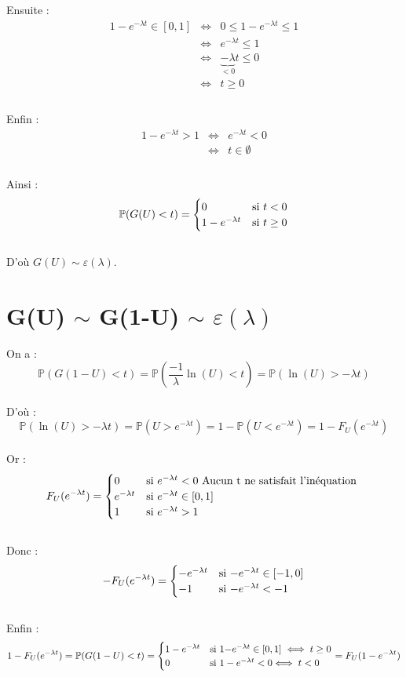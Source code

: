 \documentclass[12,french]{report}
\begin{document}
Ensuite :
$$\begin{array}{ccl}
	1-e^{-\lambda t}\in[0,1] & \iff & 0\leq1-e^{-\lambda t}\leq1 \\
					   & \iff & e^{-\lambda t}\leq1 \\
					   & \iff & \underbrace{-\lambda}_{<0}t\leq0 \\
					   & \iff & t\geq0 \\
\end{array}$$\\

Enfin :
$$\begin{array}{ccl}
	1-e^{-\lambda t}>1 & \iff & e^{-\lambda t}<0 \\
	& \iff & t\in\emptyset \\
  \end{array}$$\\
  
Ainsi :
$$\mathbb{P}(G(U)<t)=\begin{cases}
0 & \text{si \ensuremath{t<0}}\\
1-e^{-\lambda t} & \text{si }t\geq0
\end{cases}$$\\

D'où $G(U) \sim \varepsilon(\lambda)$.\vspace{0.4cm}
 
\section{G(U) $\sim$ G(1-U) $\sim$ $\varepsilon(\lambda)$}

On a :
$$\mathbb{P}(G(1-U)<t)=\mathbb{P}(\frac{-1}{\lambda}\ln(U)<t)=\mathbb{P}(\ln(U)>-\lambda t)$$\\
D'où : $$\mathbb{P}(\ln(U)>-\lambda t)=\mathbb{P}(U>e^{-\lambda t})=1-\mathbb{P}(U<e^{-\lambda t})=1-F_{U}(e^{-\lambda t})$$\\

Or : $$F_{U}(e^{-\lambda t})=\begin{cases}
0 & \text{si \ensuremath{e^{-\lambda t}<0}}\text{ Aucun t ne satisfait l'inéquation }\\
e^{-\lambda t} & \text{si \ensuremath{e^{-\lambda t}}}\in[0,1]\\
1 & \text{si \ensuremath{e^{-\lambda t}>1}}
\end{cases}$$\\
Donc :
$$-F_{U}(e^{-\lambda t})=\begin{cases}
-e^{-\lambda t} & \text{si \ensuremath{-}\ensuremath{e^{-\lambda t}}}\in[-1,0]\\
-1 & \text{si \ensuremath{-e^{-\lambda t}<-1}}
\end{cases}$$\\
Enfin :
$$1-F_{U}(e^{-\lambda t})=\mathbb{P}(G(1-U)<t)=\begin{cases}
1-e^{-\lambda t} & \text{si \ensuremath{1-}\ensuremath{e^{-\lambda t}}}\in[0,1]\iff t\geq0\\
0 & \text{si \ensuremath{1-e^{-\lambda t}<0}\ensuremath{\iff t<0}}
\end{cases}=F_{U}(1-e^{-\lambda t})$$\\
\end{document}

